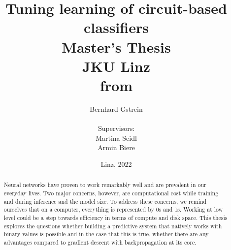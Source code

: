 \documentclass[a4paper,12pt]{article}
\begin{document}
\usetikzlibrary{patterns}

%
    \title{Tuning learning of circuit-based classifiers\\
    \vspace{2em}
    Master's Thesis\\
    \vspace{2em}
    JKU Linz\\
    \vspace{1.5em}
    from}

    \author{
 	\LARGE Bernhard Gstrein\\
 	\vspace{.5em} \\
 	Supervisors:\\
 	Martina Seidl\\
 	Armin Biere\\
 	\vspace{1em}
	}
    
\date{Linz, 2022}

\maketitle
   
\begin{abstract}
\noindent Neural networks have proven to work remarkably well and are prevalent in our everyday lives. Two major concerns, however, are computational cost while training and during inference and the model size. To address these concerns, we remind ourselves that on a computer, everything is represented by 0s and 1s. Working at low level could be a step towards efficiency in terms of compute and disk space. This thesis explores the questions whether building a predictive system that natively works with binary values is possible and in the case that this is true, whether there are any advantages compared to gradient descent with backpropagation at its core.
\end{abstract}
   
\newpage
   
\tableofcontents
 
\newpage
    













\end{document}
